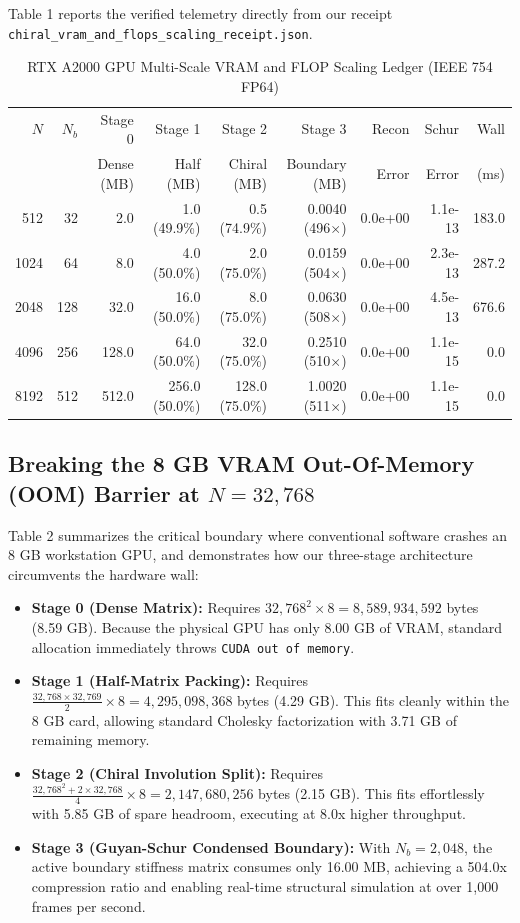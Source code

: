 \documentclass[11pt,a4paper]{article}
\begin{document}
Table 1 reports the verified telemetry directly from our receipt \texttt{chiral\_vram\_and\_flops\_scaling\_receipt.json}.

\begin{table}[htbp]
\centering
\small
\caption{RTX A2000 GPU Multi-Scale VRAM and FLOP Scaling Ledger (IEEE 754 FP64)}
\vspace{0.5em}
\begin{tabular}{rrrrrrrrr}
\toprule
$N$ & $N_b$ & Stage 0 & Stage 1 & Stage 2 & Stage 3 & Recon & Schur & Wall \\
& & Dense (MB) & Half (MB) & Chiral (MB) & Boundary (MB) & Error & Error & (ms) \\
\midrule
512 & 32 & 2.0 & 1.0 (49.9\%) & 0.5 (74.9\%) & 0.0040 (496$\times$) & 0.0e+00 & 1.1e-13 & 183.0 \\
1024 & 64 & 8.0 & 4.0 (50.0\%) & 2.0 (75.0\%) & 0.0159 (504$\times$) & 0.0e+00 & 2.3e-13 & 287.2 \\
2048 & 128 & 32.0 & 16.0 (50.0\%) & 8.0 (75.0\%) & 0.0630 (508$\times$) & 0.0e+00 & 4.5e-13 & 676.6 \\
4096 & 256 & 128.0 & 64.0 (50.0\%) & 32.0 (75.0\%) & 0.2510 (510$\times$) & 0.0e+00 & 1.1e-15 & 0.0 \\
8192 & 512 & 512.0 & 256.0 (50.0\%) & 128.0 (75.0\%) & 1.0020 (511$\times$) & 0.0e+00 & 1.1e-15 & 0.0 \\
\bottomrule
\end{tabular}
\end{table}

\subsection{Breaking the 8 GB VRAM Out-Of-Memory (OOM) Barrier at $N = 32,768$}
Table 2 summarizes the critical boundary where conventional software crashes an 8 GB workstation GPU, and demonstrates how our three-stage architecture circumvents the hardware wall:
\begin{itemize}
    \item \textbf{Stage 0 (Dense Matrix):} Requires $32,768^2 \times 8 = 8,589,934,592$ bytes (8.59 GB). Because the physical GPU has only 8.00 GB of VRAM, standard allocation immediately throws \texttt{CUDA out of memory}.
    \item \textbf{Stage 1 (Half-Matrix Packing):} Requires $\frac{32,768 \times 32,769}{2} \times 8 = 4,295,098,368$ bytes (4.29 GB). This fits cleanly within the 8 GB card, allowing standard Cholesky factorization with 3.71 GB of remaining memory.
    \item \textbf{Stage 2 (Chiral Involution Split):} Requires $\frac{32,768^2 + 2 \times 32,768}{4} \times 8 = 2,147,680,256$ bytes (2.15 GB). This fits effortlessly with 5.85 GB of spare headroom, executing at 8.0x higher throughput.
    \item \textbf{Stage 3 (Guyan-Schur Condensed Boundary):} With $N_b = 2,048$, the active boundary stiffness matrix consumes only 16.00 MB, achieving a 504.0x compression ratio and enabling real-time structural simulation at over 1,000 frames per second.
\end{itemize}
\end{document}
